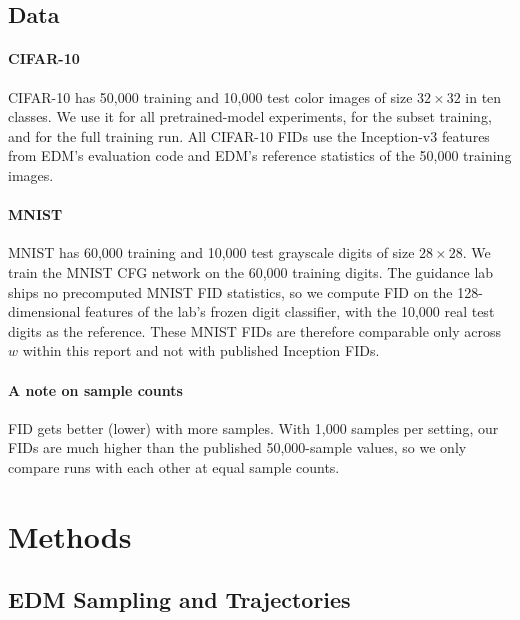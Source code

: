 \documentclass[12pt,letterpaper]{article}
\begin{document}
\subsection{Data}
\label{sec:data}

\paragraph{CIFAR-10}
CIFAR-10 has 50,000 training and 10,000 test color images of size \(32 \times 32\) in ten classes.
We use it for all pretrained-model experiments, for the subset training, and for the full training run.
All CIFAR-10 FIDs use the Inception-v3 features from EDM's evaluation code and EDM's reference statistics of the 50,000 training images.

\paragraph{MNIST}
MNIST has 60,000 training and 10,000 test grayscale digits of size \(28 \times 28\).
We train the MNIST CFG network on the 60,000 training digits.
The guidance lab ships no precomputed MNIST FID statistics, so we compute FID on the 128-dimensional features of the lab's frozen digit classifier, with the 10,000 real test digits as the reference.
These MNIST FIDs are therefore comparable only across \(w\) within this report and not with published Inception FIDs.

\paragraph{A note on sample counts}
FID gets better (lower) with more samples.
With 1,000 samples per setting, our FIDs are much higher than the published 50,000-sample values, so we only compare runs with each other at equal sample counts.

\section{Methods}

\subsection{EDM Sampling and Trajectories}
\end{document}
